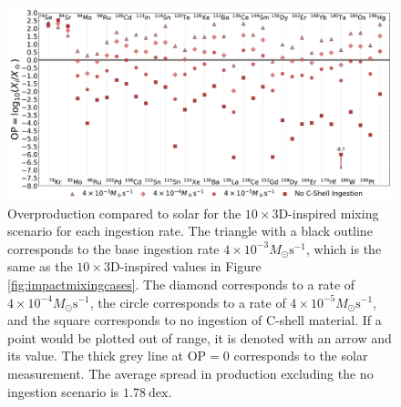 \begin{figure}[!htbp]
\includegraphics[width=\textwidth]{chapters/2/figures/ingest_10x3D.pdf}
\caption{Overproduction compared to solar for the $10\times$3D-inspired mixing scenario for each ingestion rate. The triangle with a black outline corresponds to the base ingestion rate $4\times10^{-3}M_\odot\mathrm{s^{-1}}$, which is the same as the $10\times$3D-inspired values in Figure \ref{fig:impactmixingcases}. The diamond corresponds to a rate of $4\times10^{-4}M_\odot\mathrm{s^{-1}}$, the circle corresponds to a rate of $4\times10^{-5}M_\odot\mathrm{s^{-1}}$, and the square corresponds to no ingestion of C-shell material. If a point would be plotted out of range, it is denoted with an arrow and its value. The thick grey line at $\mathrm{OP}=0$ corresponds to the solar measurement. The average spread in production excluding the no ingestion scenario is $1.78~\mathrm{dex}$.
\label{fig:ingest_10x3D}} 
\end{figure}

